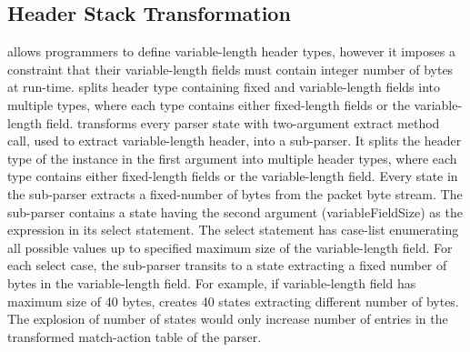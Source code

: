 \documentclass[letterpaper,twocolumn,10pt]{article}
\begin{document}
\subsection{Header Stack Transformation}
\label{subsection:header-stack-transformation}
\ulang allows programmers to define variable-length header types, 
however it imposes a constraint that their variable-length fields must 
contain integer number of bytes at run-time.
\ucomp splits header type containing fixed and variable-length 
fields into multiple types, where each type contains either 
fixed-length fields or the variable-length field.
\ucomp transforms every parser state with two-argument extract method 
call, used to extract variable-length header, into a sub-parser.
It splits the header type of the instance in the first argument into 
multiple header types, where each type contains either fixed-length 
fields or 
the variable-length field.
Every state in the sub-parser extracts a fixed-number of bytes from 
the packet byte stream.
The sub-parser contains a state having the second argument 
(variableFieldSize) as the expression in its select statement.
The select statement has case-list enumerating all possible values up 
to specified maximum size of the variable-length field.
For each select case, the sub-parser transits to a state extracting a 
fixed number of bytes in the variable-length field.
For example, if variable-length field has maximum size of 40 bytes, 
\ucomp creates 40 states extracting different number of bytes.
The explosion of number of states would only increase number of 
entries in the transformed match-action table of the parser.

% 
% 
\end{document}

